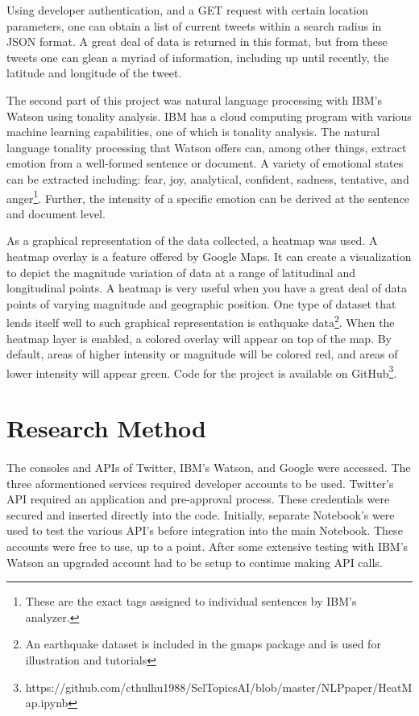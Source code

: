 \documentclass[12pt, oneside]{article}
\begin{document}
Using developer authentication, and a GET request with certain location
parameters, one can obtain a list of current tweets within a search radius in
JSON format. A great deal of data is returned in this format, but from
these tweets one can glean a myriad of information, including up until
recently, the latitude and longitude of the tweet.

The second part of this project was natural language processing with IBM's
Watson using tonality analysis. IBM has a cloud computing program with various
machine learning capabilities\cite{IBM}, one of which is tonality analysis. The
natural language tonality processing that Watson offers can, among other
things, extract emotion from a well-formed sentence or document. A variety of
emotional states can be extracted including: fear, joy, analytical,
confident, sadness, tentative, and anger\footnote{These are the exact tags
assigned to individual sentences by IBM's analyzer.}. Further, the intensity of
a specific emotion can be derived at the sentence and document level.

As a graphical representation of the data collected, a heatmap was used. A
heatmap overlay is a feature offered by Google Maps. It can create a
visualization to depict the magnitude variation of data at a range of
latitudinal and longitudinal points. A heatmap is very useful when you have a
great deal of data points of varying magnitude and geographic position.
One type of dataset that lends itself well to such graphical representation is
eathquake data\footnote{An earthquake
dataset is included in the gmaps package and is used for illustration and
tutorials}. When the heatmap layer is enabled, a colored overlay will appear on
top of the map. By default, areas of higher intensity or magnitude will be
colored red, and areas of lower intensity will appear green\cite{Google}. Code for the project is available on GitHub\footnote{https://github.com/cthulhu1988/SelTopicsAI/blob/master/NLPpaper/HeatMap.ipynb}.

\section{Research Method}
\paragraph{}
The consoles and APIs of Twitter, IBM's Watson, and Google were
accessed. The three aformentioned services required developer accounts to be
used. Twitter's API required an application and pre-approval process. These
credentials were secured and inserted directly into the code.
Initially, separate Notebook's were used to test the various API's before
integration into the main Notebook. These accounts were free to use, up to a
point. After some extensive testing with IBM's Watson an
upgraded account had to be setup to continue making API calls.
\end{document}

